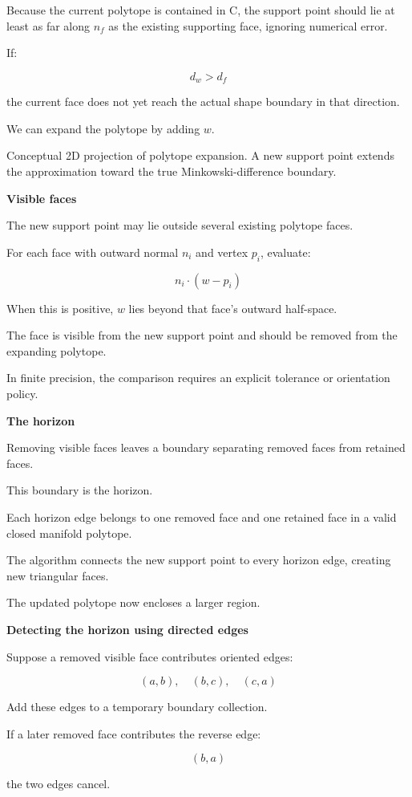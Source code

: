 Because the current polytope is contained in C, the support point should lie at least as far along \(n_f\) as the existing supporting face, ignoring numerical error.

If:

\[
d_w>d_f
\]

the current face does not yet reach the actual shape boundary in that direction.

We can expand the polytope by adding \(w\).

Conceptual 2D projection of polytope expansion. A new support point extends the approximation toward the true Minkowski-difference boundary.

\textbf{Visible faces}

The new support point may lie outside several existing polytope faces.

For each face with outward normal \(n_i\) and vertex \(p_i\), evaluate:

\[
\boxed{ n_i\cdot(w-p_i) }
\]

When this is positive, \(w\) lies beyond that face's outward half-space.

The face is visible from the new support point and should be removed from the expanding polytope.

In finite precision, the comparison requires an explicit tolerance or orientation policy.

\textbf{The horizon}

Removing visible faces leaves a boundary separating removed faces from retained faces.

This boundary is the horizon.

Each horizon edge belongs to one removed face and one retained face in a valid closed manifold polytope.

The algorithm connects the new support point to every horizon edge, creating new triangular faces.

The updated polytope now encloses a larger region.

\textbf{Detecting the horizon using directed edges}

Suppose a removed visible face contributes oriented edges:

\[
(a,b),\quad(b,c),\quad(c,a)
\]

Add these edges to a temporary boundary collection.

If a later removed face contributes the reverse edge:

\[
(b,a)
\]

the two edges cancel.

